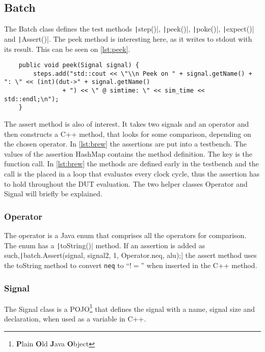 \subsection{Batch}
The Batch class defines the test methods \texttt|step()|, \texttt|peek()|, \texttt|poke()|, \texttt|expect()| and \texttt|Assert()|. The peek method is interesting here, as it writes to stdout with its result. This can be seen on \cref{lst:peek}.
\begin{listing}
    \centering
    \caption{The peek method}\label{lst:peek}
    \begin{verbatim}
    public void peek(Signal signal) {
        steps.add("std::cout << \"\\n Peek on " + signal.getName() + ": \" << (int)(dut->" + signal.getName()
                + ") << \" @ simtime: \" << sim_time << std::endl;\n");
    }
    \end{verbatim}
\end{listing}
The assert method is also of interest. It takes two signals and an operator and then constructs a C++ method, that looks for some comparison, depending on the chosen operator. In \cref{lst:brew} the assertions are put into a testbench. The values of the assertion HashMap contains the method definition. The key is the function call. In \cref{lst:brew} the methods are defined early in the testbench and the call is the placed in a loop that evaluates every clock cycle, thus the assertion has to hold throughout the DUT evaluation. The two helper classes Operator and Signal will briefly be explained.
\subsubsection{Operator}
The operator is a Java enum that comprises all the operators for comparison. The enum has a \texttt|toString()| method. If an assertion is added as such,\newline\texttt|batch.Assert(signal, signal2, 1, Operator.neq, alu);| the assert method uses the toString method to convert \texttt{neq} to ``\(!=\)'' when inserted in the C++ method.
\subsubsection{Signal}
The Signal class is a POJO\footnote{\textbf{P}lain \textbf{O}ld \textbf{J}ava \textbf{O}bject} that defines the signal with a name, signal size and declaration, when used as a variable in C++.
